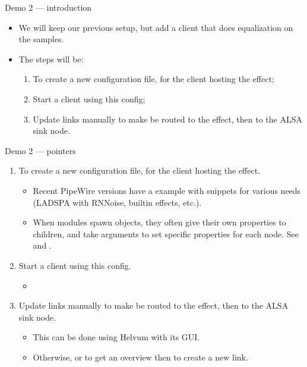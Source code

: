 \begin{frame}{Demo 2 — introduction}
  \begin{itemize}

  \item We will keep our previous setup, but add a client that does
    equalization on the samples.

  \item The steps will be:

    \begin{enumerate}
    \item To create a new configuration file, for the client hosting the effect;
    \item Start a client using this config;
    \item Update links manually to make  be routed to the
      effect, then to the ALSA sink node.
    \end{enumerate}

  \end{itemize}
\end{frame}



\begin{frame}[fragile]{Demo 2 — pointers}
  \begin{enumerate}

  \item To create a new configuration file, for the client hosting the effect.

    \begin{itemize}
    \item Recent PipeWire versions have a 
      example with snippets for various needs (LADSPA with RNNoise,
      builtin effects, etc.).
    \item When modules spawn objects, they often give their own
      properties to children, and take arguments to set specific
      properties for each node. See  and
      .
    \end{itemize}

  \item Start a client using this config.

    \begin{itemize}
    \item {}
    \end{itemize}

  \item Update links manually to make  be routed to the
    effect, then to the ALSA sink node.

    \begin{itemize}
    \item This can be done using Helvum with its GUI.
    \item Otherwise,
       or  to get an overview then
       to create a new link.
    \end{itemize}

  \end{enumerate}
\end{frame}




